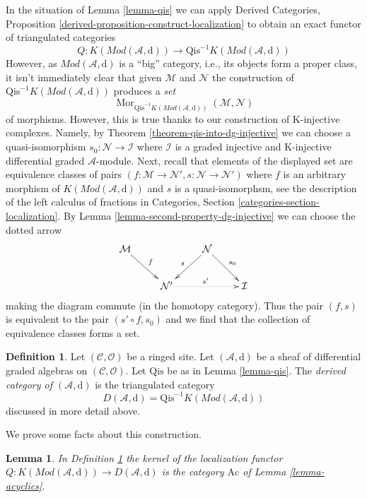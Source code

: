 \documentclass{stacks-project}
\theoremstyle{plain}
\newtheorem{lemma}[subsection]{Lemma}
\theoremstyle{definition}
\newtheorem{definition}[subsection]{Definition}
\theoremstyle{remark}
\numberwithin{equation}{subsection}
\def\Mor{\mathop{\mathrm{Mor}}\nolimits}
\begin{document}
\noindent
In the situation of Lemma \ref{lemma-qis} we can apply
Derived Categories, Proposition
\ref{derived-proposition-construct-localization}
to obtain an exact functor of triangulated categories
$$
Q :
K(\textit{Mod}(\mathcal{A}, \text{d}))
\longrightarrow
\text{Qis}^{-1}K(\textit{Mod}(\mathcal{A}, \text{d}))
$$
However, as $\textit{Mod}(\mathcal{A}, \text{d})$ is a ``big''
category, i.e., its objects form a proper class, it isn't immediately
clear that given $\mathcal{M}$ and $\mathcal{N}$ the construction
of $\text{Qis}^{-1}K(\textit{Mod}(\mathcal{A}, \text{d}))$
produces a {\it set}
$$
\Mor_{\text{Qis}^{-1}K(\textit{Mod}(\mathcal{A}, \text{d}))}
(\mathcal{M}, \mathcal{N})
$$
of morphisms. However, this is true thanks to our construction of
K-injective complexes. Namely, by Theorem \ref{theorem-qis-into-dg-injective}
we can choose a quasi-isomorphism $s_0 : \mathcal{N} \to \mathcal{I}$ where
$\mathcal{I}$ is a graded injective and K-injective
differential graded $\mathcal{A}$-module. Next, recall that elements of
the displayed set are equivalence classes of pairs
$(f : \mathcal{M} \to \mathcal{N}', s : \mathcal{N} \to \mathcal{N}')$
where $f$ is an arbitrary morphism of
$K(\textit{Mod}(\mathcal{A}, \text{d}))$ and $s$ is a quasi-isomorphsm, see
the description of the left calculus of fractions in
Categories, Section \ref{categories-section-localization}.
By Lemma \ref{lemma-second-property-dg-injective}
we can choose the dotted arrow
$$
\xymatrix{
\mathcal{M} \ar[rd]^f & &
\mathcal{N} \ar[ld]_s \ar[rd]^{s_0} \\
& \mathcal{N}' \ar@{..>}[rr]^{s'} & & \mathcal{I}
}
$$
making the diagram commute (in the homotopy category).
Thus the pair $(f, s)$ is equivalent to the pair $(s' \circ f, s_0)$
and we find that the collection of equivalence classes forms a set.

\begin{definition}
\label{definition-derived-category}
Let $(\mathcal{C}, \mathcal{O})$ be a ringed site. Let
$(\mathcal{A}, \text{d})$ be a sheaf of differential graded algebras
on $(\mathcal{C}, \mathcal{O})$. Let $\text{Qis}$ be as in
Lemma \ref{lemma-qis}. The
{\it derived category of $(\mathcal{A}, \text{d})$} is the triangulated
category
$$
D(\mathcal{A}, \text{d}) =
\text{Qis}^{-1}K(\textit{Mod}(\mathcal{A}, \text{d}))
$$
discussed in more detail above.
\end{definition}

\noindent
We prove some facts about this construction.

\begin{lemma}
\label{lemma-kernel-localization}
In Definition \ref{definition-derived-category}
the kernel of the localization functor
$Q : K(\textit{Mod}(\mathcal{A}, \text{d})) \to D(\mathcal{A}, \text{d})$
is the category $\text{Ac}$ of Lemma \ref{lemma-acyclics}.
\end{lemma}
\end{document}
